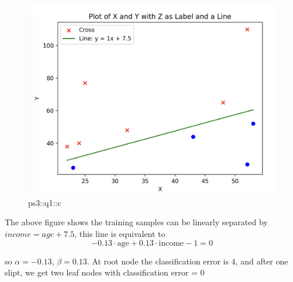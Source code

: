 \begin{answer}
\begin{figure}[H]
    \centering
    \includegraphics[width=0.5\linewidth]{Screenshot 2024-02-20 at 23.45.57.png}
    \caption{ps3::q1::c}
    \label{fig:enter-label}
\end{figure}

The above figure shows the training samples can be linearly separated by $income = age + 7.5$, this line is equivalent to 
\begin{equation}
    -0.13 \cdot  \text{age} + 0.13 \cdot  \text{income} - 1 = 0
\end{equation}

so $\alpha = -0.13$, $\beta = 0.13$. At root node the classification error is 4, and after one slipt, we get two leaf nodes with classification error = 0
\end{answer}